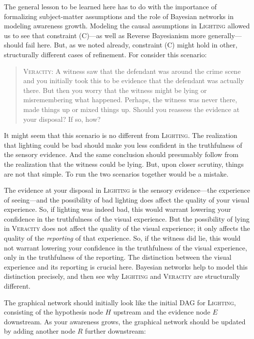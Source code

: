 \documentclass[
  11pt,
  dvipsnames,enabledeprecatedfontcommands]{scrartcl}
\begin{document}
The general lesson to be learned here has to do with the importance of
formalizing subject-matter assumptions and the role of Bayesian networks
in modeling awareness growth. Modeling the causal assumptions in
\textsc{Lighting} allowed us to see that constraint (C)---as well as
Reverse Bayesianism more generally---should fail here. But, as we noted
already, constraint (C) might hold in other, structurally different
cases of refinement. For consider this scenario:

\begin{quote}
\textsc{Veracity}: A witness saw that the defendant was around the crime
scene and you initially took this to be evidence that the defendant was
actually there. But then you worry that the witness might be lying or
misremembering what happened. Perhaps, the witness was never there, made
things up or mixed things up. Should you reassess the evidence at your
disposal? If so, how?
\end{quote}

\doublespace

\noindent   It might seem that this scenario is no different from
\textsc{Lighting}. The realization that lighting could be bad should
make you less confident in the truthfulness of the sensory evidence. And
the same conclusion should presumably follow from the realization that
the witness could be lying. But, upon closer scrutiny, things are not
that simple. To run the two scenarios together would be a mistake.

The evidence at your disposal in \textsc{Lighting} is the sensory
evidence---the experience of seeing---and the possibility of bad
lighting does affect the quality of your visual experience. So, if
lighting was indeed bad, this would warrant lowering your confidence in
the truthfulness of the visual experience. But the possibility of lying
in \textsc{Veracity} does not affect the quality of the visual
experience; it only affects the quality of the \textit{reporting} of
that experience. So, if the witness did lie, this would not warrant
lowering your confidence in the truthfulness of the visual experience,
only in the truthfulness of the reporting. The distinction between the
visual experience and its reporting is crucial here. Bayesian networks
help to model this distinction precisely, and then see why
\textsc{Lighting} and \textsc{Veracity} are structurally different.

The graphical network should initially look like the initial DAG for
\textsc{Lighting}, consisting of the hypothesis node \(H\) upstream and
the evidence node \(E\) downstream. As your awareness grows, the
graphical network should be updated by adding another node \(R\) further
downstream:
\end{document}
